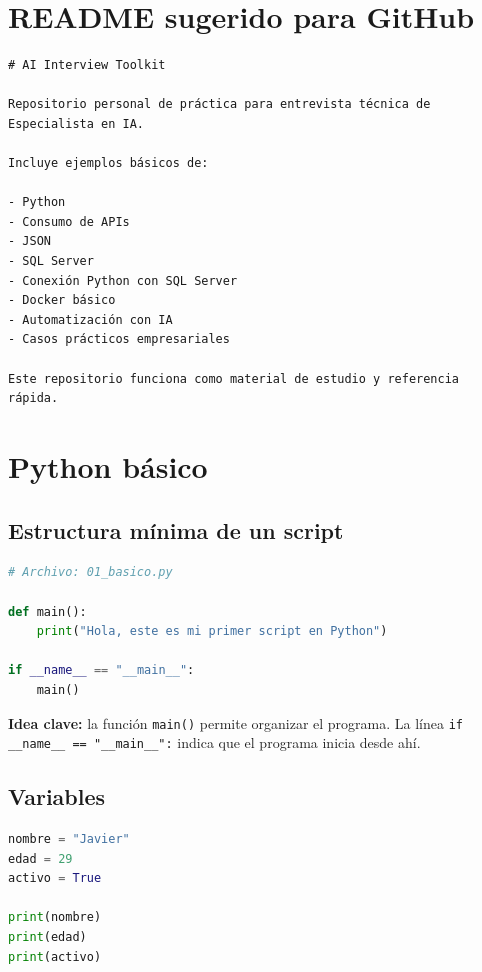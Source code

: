 \documentclass[12pt]{article}
\begin{document}
\section{README sugerido para GitHub}

\begin{lstlisting}
# AI Interview Toolkit

Repositorio personal de práctica para entrevista técnica de Especialista en IA.

Incluye ejemplos básicos de:

- Python
- Consumo de APIs
- JSON
- SQL Server
- Conexión Python con SQL Server
- Docker básico
- Automatización con IA
- Casos prácticos empresariales

Este repositorio funciona como material de estudio y referencia rápida.
\end{lstlisting}

\section{Python básico}

\subsection{Estructura mínima de un script}

\begin{lstlisting}[language=Python]
# Archivo: 01_basico.py

def main():
    print("Hola, este es mi primer script en Python")

if __name__ == "__main__":
    main()
\end{lstlisting}

\textbf{Idea clave:} la función \texttt{main()} permite organizar el programa. 
La línea \texttt{if \_\_name\_\_ == "\_\_main\_\_":} indica que el programa inicia desde ahí.

\subsection{Variables}

\begin{lstlisting}[language=Python]
nombre = "Javier"
edad = 29
activo = True

print(nombre)
print(edad)
print(activo)
\end{lstlisting}
\end{document}
